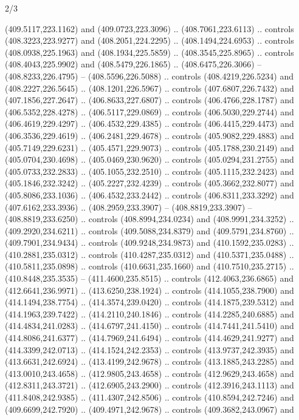 \begin{flagdescription}{2/3}
\begin{scope}[xshift=0.5\flaglength,yshift=0.5\flagwidth,scale=\flagwidth/495.65]
\begin{scope}[y=0.8pt, x=0.8pt, yscale=-1,shift={(-463.76,-309.78)}]
  (409.5117,223.1162) and (409.0723,223.3096) .. (408.7061,223.6113) .. controls
  (408.3223,223.9277) and (408.2051,224.2295) .. (408.1494,224.6953) .. controls
  (408.0938,225.1963) and (408.1934,225.5859) .. (408.3545,225.8965) .. controls
  (408.4043,225.9902) and (408.5479,226.1865) .. (408.6475,226.3066) --
  (408.8233,226.4795) -- (408.5596,226.5088) .. controls (408.4219,226.5234) and
  (408.2227,226.5645) .. (408.1201,226.5967) .. controls (407.6807,226.7432) and
  (407.1856,227.2647) .. (406.8633,227.6807) .. controls (406.4766,228.1787) and
  (406.5352,228.4278) .. (406.5117,229.0869) .. controls (406.5030,229.2744) and
  (406.4619,229.4297) .. (406.4532,229.4385) .. controls (406.4415,229.4473) and
  (406.3536,229.4619) .. (406.2481,229.4678) .. controls (405.9082,229.4883) and
  (405.7149,229.6231) .. (405.4571,229.9073) .. controls (405.1788,230.2149) and
  (405.0704,230.4698) .. (405.0469,230.9620) .. controls (405.0294,231.2755) and
  (405.0733,232.2833) .. (405.1055,232.2510) .. controls (405.1115,232.2423) and
  (405.1846,232.3242) .. (405.2227,232.4239) .. controls (405.3662,232.8077) and
  (405.8086,233.1036) .. (406.4532,233.2442) .. controls (406.8311,233.3292) and
  (407.6162,233.3936) .. (408.2959,233.3907) -- (408.8819,233.3907) --
  (408.8819,233.6250) .. controls (408.8994,234.0234) and (408.9991,234.3252) ..
  (409.2920,234.6211) .. controls (409.5088,234.8379) and (409.5791,234.8760) ..
  (409.7901,234.9434) .. controls (409.9248,234.9873) and (410.1592,235.0283) ..
  (410.2881,235.0312) .. controls (410.4287,235.0312) and (410.5371,235.0488) ..
  (410.5811,235.0898) .. controls (410.6631,235.1660) and (410.7510,235.2715) ..
  (410.8448,235.3535) -- (411.4600,235.8515) .. controls (412.4063,236.6865) and
  (412.6641,236.9971) .. (413.6250,238.1924) .. controls (414.1055,238.7900) and
  (414.1494,238.7754) .. (414.3574,239.0420) .. controls (414.1875,239.5312) and
  (414.1963,239.7422) .. (414.2110,240.1846) .. controls (414.2285,240.6885) and
  (414.4834,241.0283) .. (414.6797,241.4150) .. controls (414.7441,241.5410) and
  (414.8086,241.6377) .. (414.7969,241.6494) .. controls (414.4629,241.9277) and
  (414.3399,242.0713) .. (414.1524,242.2353) .. controls (413.9737,242.3935) and
  (413.6631,242.6924) .. (413.4199,242.9678) .. controls (413.1885,243.2285) and
  (413.0010,243.4658) .. (412.9805,243.4658) .. controls (412.9629,243.4658) and
  (412.8311,243.3721) .. (412.6905,243.2900) .. controls (412.3916,243.1113) and
  (411.8408,242.9385) .. (411.4307,242.8506) .. controls (410.8594,242.7246) and
  (409.6699,242.7920) .. (409.4971,242.9678) .. controls (409.3682,243.0967) and

\end{scope}
\end{scope}
\end{flagdescription}
